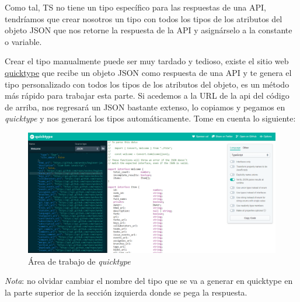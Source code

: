 Como tal, TS no tiene un tipo específico para las respuestas de una API, tendríamos que crear nosotros un tipo con todos los tipos de los atributos del objeto JSON que nos retorne la respuesta de la API y asignárselo a la constante o variable.

Crear el tipo manualmente puede ser muy tardado y tedioso, existe el sitio web \textcolor{enlaces}{\href{https://app.quicktype.io/}{quicktype}} que recibe un objeto JSON como respuesta de una API y te genera el tipo personalizado con todos los tipos de los atributos del objeto, es un método más rápido para trabajar esta parte. Si acedemos a la URL de la api del código de arriba, nos regresará un JSON bastante extenso, lo copiamos y pegamos en \textit{quicktype} y nos generará los tipos automáticamente. Tome en cuenta lo siguiente:
\begin{figure}[H]
    \centering
    \caption{Área de trabajo de \textit{quicktype}}
    \label{fig:2}
    \includegraphics[width=\textwidth]{ss/2.png}
\end{figure}

\textit{Nota}: no olvidar cambiar el nombre del tipo que se va a generar en quicktype en la parte superior de la sección izquierda donde se pega la respuesta.

